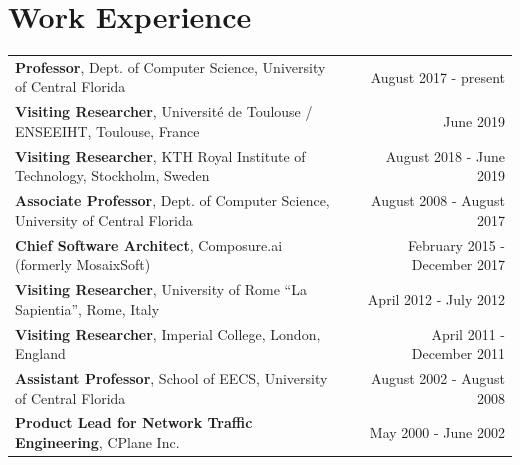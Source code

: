 
\section{Work Experience}

\begin{tabularx}{\linewidth}{lXr}
    \textbf{Professor}, Dept. of Computer Science, University of Central Florida & & \hfill August 2017 - present \\[3.75pt] 
    \textbf{Visiting Researcher}, Université de Toulouse / ENSEEIHT, Toulouse, France &  & \hfill June 2019 \\[3.75pt]
    \textbf{Visiting Researcher}, KTH Royal Institute of Technology, Stockholm, Sweden &  & \hfill August 2018 - June 2019 \\[3.75pt]
    \textbf{Associate Professor}, Dept. of Computer Science, University of Central Florida &  & \hfill August 2008 - August 2017 \\[3.75pt]
    \textbf{Chief Software Architect}, Composure.ai (formerly MosaixSoft) &  & \hfill February 2015 - December 2017 \\[3.75pt]
    \textbf{Visiting Researcher}, University of Rome ``La Sapientia'', Rome, Italy &  & \hfill April 2012 - July 2012 \\[3.75pt]
    \textbf{Visiting Researcher}, Imperial College, London, England &  & \hfill April 2011 - December 2011 \\[3.75pt]
    \textbf{Assistant Professor}, School of EECS, University of Central Florida &  & \hfill August 2002 - August 2008 \\[3.75pt]
    \textbf{Product Lead for Network Traffic Engineering}, CPlane Inc. &  & \hfill May 2000 - June 2002 \\[3.75pt]

\end{tabularx}





